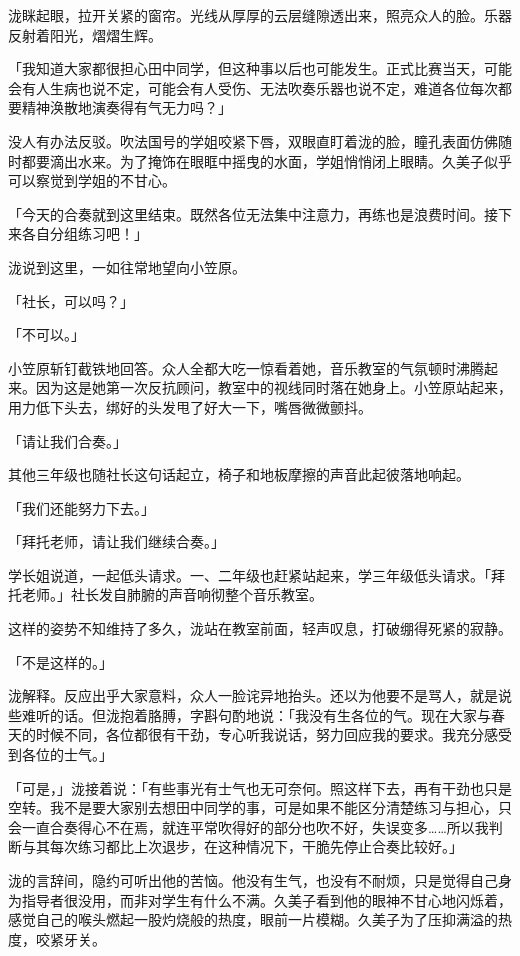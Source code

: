 \documentclass[UTF8]{ctexart}
\begin{document}
    泷眯起眼，拉开关紧的窗帘。光线从厚厚的云层缝隙透出来，照亮众人的脸。乐器反射着阳光，熠熠生辉。 

    「我知道大家都很担心田中同学，但这种事以后也可能发生。正式比赛当天，可能会有人生病也说不定，可能会有人受伤、无法吹奏乐器也说不定，难道各位每次都要精神涣散地演奏得有气无力吗？」 

    没人有办法反驳。吹法国号的学姐咬紧下唇，双眼直盯着泷的脸，瞳孔表面仿佛随时都要滴出水来。为了掩饰在眼眶中摇曳的水面，学姐悄悄闭上眼睛。久美子似乎可以察觉到学姐的不甘心。 

    「今天的合奏就到这里结束。既然各位无法集中注意力，再练也是浪费时间。接下来各自分组练习吧！」 

    泷说到这里，一如往常地望向小笠原。 

    「社长，可以吗？」 

    「不可以。」 

    小笠原斩钉截铁地回答。众人全都大吃一惊看着她，音乐教室的气氛顿时沸腾起来。因为这是她第一次反抗顾问，教室中的视线同时落在她身上。小笠原站起来，用力低下头去，绑好的头发甩了好大一下，嘴唇微微颤抖。 

    「请让我们合奏。」 

    其他三年级也随社长这句话起立，椅子和地板摩擦的声音此起彼落地响起。 

    「我们还能努力下去。」 

    「拜托老师，请让我们继续合奏。」 

    学长姐说道，一起低头请求。一、二年级也赶紧站起来，学三年级低头请求。「拜托老师。」社长发自肺腑的声音响彻整个音乐教室。 

    这样的姿势不知维持了多久，泷站在教室前面，轻声叹息，打破绷得死紧的寂静。 

    「不是这样的。」 

    泷解释。反应出乎大家意料，众人一脸诧异地抬头。还以为他要不是骂人，就是说些难听的话。但泷抱着胳膊，字斟句酌地说：「我没有生各位的气。现在大家与春天的时候不同，各位都很有干劲，专心听我说话，努力回应我的要求。我充分感受到各位的士气。」 

    「可是，」泷接着说：「有些事光有士气也无可奈何。照这样下去，再有干劲也只是空转。我不是要大家别去想田中同学的事，可是如果不能区分清楚练习与担心，只会一直合奏得心不在焉，就连平常吹得好的部分也吹不好，失误变多……所以我判断与其每次练习都比上次退步，在这种情况下，干脆先停止合奏比较好。」 

    泷的言辞间，隐约可听出他的苦恼。他没有生气，也没有不耐烦，只是觉得自己身为指导者很没用，而非对学生有什么不满。久美子看到他的眼神不甘心地闪烁着，感觉自己的喉头燃起一股灼烧般的热度，眼前一片模糊。久美子为了压抑满溢的热度，咬紧牙关。 
\end{document}
